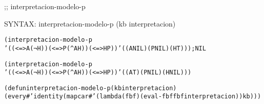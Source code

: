 \begin{aibox}{\function}
;; interpretacion-modelo-p

SYNTAX: interpretacion-modelo-p (kb interpretacion) 
\end{aibox}

\begin{aibox}{\examples}
\begin{alltt}


(interpretacion-modelo-p 
 '((<=> A (¬ H)) (<=> P (^ A  H)) (<=> H P)) '((A NIL) (P NIL) (H T))); NIL

(interpretacion-modelo-p
 '((<=> A (¬ H)) (<=> P (^ A  H)) (<=> H P)) '((A T) (P NIL) (H NIL)))

\end{alltt}
\end{aibox}

\begin{aibox}{\comments}

\end{aibox}
\begin{aibox}{\answers}

\end{aibox}
\begin{aibox}{\othercomments}

\end{aibox}
\begin{aibox}{\pseudocode}

\end{aibox}
\begin{aibox}{\code}

\begin{alltt}

(defun interpretacion-modelo-p (kb interpretacion) 
  (every #'identity (mapcar #'(lambda (fbf) (eval-fbf fbf interpretacion)) kb)))

\end{alltt}
\end{aibox}
